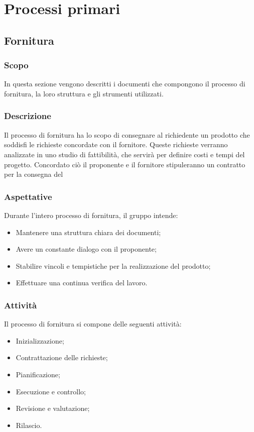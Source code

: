 \chapter{Processi primari}

\section{Fornitura}
\subsection{Scopo}
In questa sezione vengono descritti i documenti che compongono il processo di fornitura, la loro struttura e gli strumenti utilizzati.

\subsection{Descrizione}
Il processo di fornitura ha lo scopo di consegnare al richiedente un prodotto che soddisfi le richieste concordate con il fornitore.
Queste richieste verranno analizzate in uno studio di fattibilità, che servirà per definire costi e tempi del progetto. Concordato ciò il proponente e il fornitore stipuleranno un contratto per la consegna del

\subsection{Aspettative}
Durante l’intero processo di fornitura, il gruppo intende:
\begin{itemize}
    \item Mantenere una struttura chiara dei documenti;
    \item Avere un constante dialogo con il proponente;
    \item Stabilire vincoli e tempistiche per la realizzazione del prodotto;
    \item Effettuare una continua verifica del lavoro.
\end{itemize}

\subsection{Attività}
Il processo di fornitura si compone delle seguenti attività:
\begin{itemize}
    \item Inizializzazione;
    \item Contrattazione delle richieste;
    \item Pianificazione;
    \item Esecuzione e controllo;
    \item Revisione e valutazione;
    \item Rilascio.
\end{itemize}

